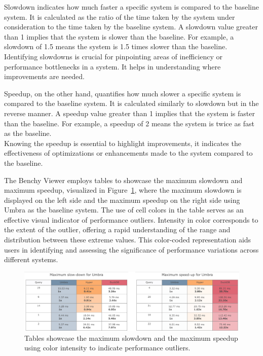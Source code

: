 Slowdown indicates how much faster a specific system is compared to the baseline system. It is calculated as the ratio of the time taken by the system under consideration to the time taken by the baseline system. A slowdown value greater than 1 implies that the system is slower than the baseline. For example, a slowdown of 1.5 means the system is 1.5 times slower than the baseline.\\
Identifying slowdowns is crucial for pinpointing areas of inefficiency or performance bottlenecks in a system. It helps in understanding where improvements are needed.

Speedup, on the other hand, quantifies how much slower a specific system is compared to the baseline system. It is calculated similarly to slowdown but in the reverse manner. A speedup value greater than 1 implies that the system is faster than the baseline. For example, a speedup of 2 means the system is twice as fast as the baseline.\\
Knowing the speedup is essential to highlight improvements, it indicates the effectiveness of optimizations or enhancements made to the system compared to the baseline.

The Benchy Viewer employs tables to showcase the maximum slowdown and maximum speedup, visualized in Figure~\ref{fig:slowdown-speedup-chart}, where the maximum slowdown is displayed on the left side and the maximum speedup on the right side using Umbra as the baseline system. The use of cell colors in the table serves as an effective visual indicator of performance outliers. Intensity in color corresponds to the extent of the outlier, offering a rapid understanding of the range and distribution between these extreme values. This color-coded representation aids users in identifying and assessing the significance of performance variations across different systems.

\begin{figure}[h]
  \centering
  \includegraphics[width=1\linewidth]{figures/bsp-table-speedup-slowdown.png}
  \caption{Tables showcase the maximum slowdown and the maximum speedup using color intensity to indicate performance outliers.}
  \label{fig:slowdown-speedup-chart}
\end{figure}

